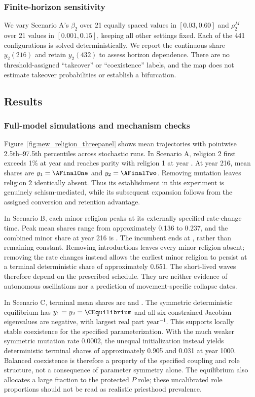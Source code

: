 \subsubsection{Finite-horizon sensitivity}
\label{subsec:heatmap}
We vary Scenario A's $\beta_2$ over 21 equally spaced values in $[0.03,0.60]$ and $\rho_2^M$ over 21 values in $[0.001,0.15]$, keeping all other settings fixed. Each of the 441 configurations is solved deterministically. We report the continuous share $y_2(216)$ and retain $y_2(432)$ to assess horizon dependence. There are no threshold-assigned ``takeover'' or ``coexistence'' labels, and the map does not estimate takeover probabilities or establish a bifurcation.

\subsection{Results}
\label{sec:results}
\subsubsection{Full-model simulations and mechanism checks}
Figure~\ref{fig:new_religion_threepanel} shows mean trajectories with pointwise 2.5th--97.5th percentiles across stochastic runs. In Scenario A, religion 2 first exceeds 1\% at year \AOnePercent{} and reaches parity with religion 1 at year \AParity{}. At year 216, mean shares are $y_1=\AFinalOne$ and $y_2=\AFinalTwo$. Removing mutation leaves religion 2 identically absent. Thus its establishment in this experiment is genuinely schism-mediated, while its subsequent expansion follows from the assigned conversion and retention advantage.

In Scenario B, each minor religion peaks at its externally specified rate-change time. Peak mean shares range from approximately 0.136 to 0.237, and the combined minor share at year 216 is \BFinalMinor{}. The incumbent ends at \BFinalIncumbent{}, rather than remaining constant. Removing introductions leaves every minor religion absent; removing the rate changes instead allows the earliest minor religion to persist at a terminal deterministic share of approximately 0.651. The short-lived waves therefore depend on the prescribed schedule. They are neither evidence of autonomous oscillations nor a prediction of movement-specific collapse dates.

In Scenario C, terminal mean shares are \CPopOne{} and \CPopTwo{}. The symmetric deterministic equilibrium has $y_1=y_2=\CEquilibrium$ and all six constrained Jacobian eigenvalues are negative, with largest real part \CMaxEigen{} year$^{-1}$. This supports locally stable coexistence for the specified parameterization. With the much weaker symmetric mutation rate $0.0002$, the unequal initialization instead yields deterministic terminal shares of approximately 0.905 and 0.031 at year 1000. Balanced coexistence is therefore a property of the specified coupling and role structure, not a consequence of parameter symmetry alone. The equilibrium also allocates a large fraction to the protected $P$ role; these uncalibrated role proportions should not be read as realistic priesthood prevalence.

